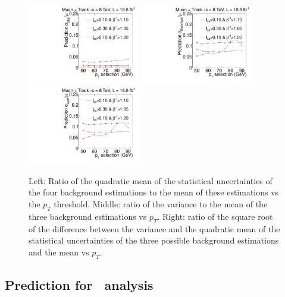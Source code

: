 \begin{figure}
\begin{center}
\includegraphics[clip=true, trim=0.0cm 0cm 3.0cm 0cm,width=0.44\textwidth]{figures/tkmu/Systematics_Data8TeV_pT_Stat}
\includegraphics[clip=true, trim=0.0cm 0cm 3.0cm 0cm,width=0.44\textwidth]{figures/tkmu/Systematics_Data8TeV_pT_Sum} \\
\includegraphics[clip=true, trim=0.0cm 0cm 3.0cm 0cm,width=0.44\textwidth]{figures/tkmu/Systematics_Data8TeV_pT_Syst}
\caption{
Left: Ratio of the quadratic
mean of the statistical uncertainties of the four background
estimations to the mean of these estimations vs
the $p_T$ threshold. Middle: ratio of the variance to the mean of the three
background estimations vs $p_T$. Right: ratio of the
square root of the difference between the variance and the quadratic
mean of the statistical uncertainties  of the three possible background
estimations and the mean vs $p_T$.
}
\label{fig:TkMuUnc}
\end{center}
\end{figure}

\subsection{Prediction for \tkonly\ analysis}


